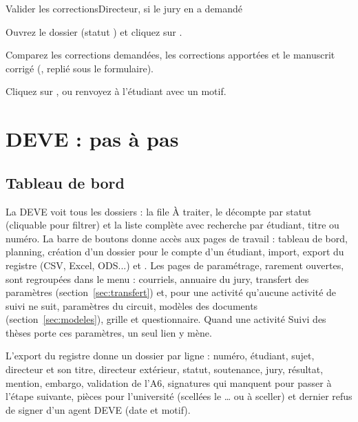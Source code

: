 \documentclass[11pt,a4paper]{article}
\begin{document}

\begin{procedure}{Valider les corrections}{Directeur, si le jury en a demandé}
\begin{etapes}
  \item Ouvrez le dossier (statut ) et cliquez sur
        .
  \item Comparez les corrections demandées, les corrections apportées et le
        manuscrit corrigé (, replié sous le formulaire).
  \item Cliquez sur , ou renvoyez à
        l'étudiant avec un motif.
\end{etapes}
\end{procedure}


\section{DEVE : pas à pas}

\subsection{Tableau de bord}

La DEVE voit tous les dossiers : la file \og À traiter\fg{}, le décompte par
statut (cliquable pour filtrer) et la liste complète avec recherche par
étudiant, titre ou numéro. La barre de boutons donne accès aux pages de
travail : tableau de bord, planning, création d'un dossier pour le compte d'un
étudiant, import, export du registre (CSV, Excel, ODS...) et . Les pages de paramétrage, rarement ouvertes, sont regroupées dans
le menu  : courriels, annuaire du jury, transfert des
paramètres (section~\ref{sec:transfert}) et, pour une activité qu'aucune
activité de suivi ne suit, paramètres du circuit, modèles des documents
(section~\ref{sec:modeles}), grille et questionnaire. Quand une activité
\og Suivi des thèses\fg{} porte ces paramètres, un seul lien y mène.

L'export du registre donne un dossier par ligne : numéro, étudiant, sujet,
directeur et son titre, directeur extérieur, statut,
soutenance, jury, résultat, mention, embargo, validation de l'A6, signatures
qui manquent pour passer à l'étape suivante, pièces pour l'université (scellées
le \ldots{} ou à sceller) et dernier refus de signer d'un agent DEVE (date et
motif).
\end{document}
